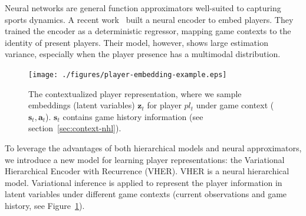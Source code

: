 \documentclass{article}
\newcommand{\latentvariables}{\mathbf{z}}
\newcommand{\state}{\mathbf{s}}
\newcommand{\action}{\mathbf{a}}
\newcommand{\player}{pl}
\begin{document}
Neural networks are general function approximators well-suited to capturing sports dynamics.
A recent work~\cite{ganguly2018problem} built a neural encoder to embed players.
They trained the encoder as a deterministic regressor, mapping game contexts to the identity of present players.
Their model, however,  shows large estimation variance, especially when the player presence has a multimodal distribution.

\begin{figure}[t!]
    \centering
    \texttt{[image: ./figures/player-embedding-example.eps]}
    \caption{The contextualized player representation, where we sample embeddings (latent variables) $\latentvariables_{t}$ for player $\player_{t}$ under game context ($\state_{t},\action_{t}$). $\state_{t}$ contains game history information (see section~\ref{sec:context-nhl}).
    } 
    \label{fig:player-represent}
\end{figure}



To leverage the advantages of both hierarchical models and neural approximators, we introduce a new model for learning player representations: the Variational Hierarchical Encoder with Recurrence (VHER). VHER is a neural hierarchical model.  Variational inference is applied to represent the player information in latent variables under different game contexts (current observations and game history, see Figure~\ref{fig:player-represent}).
\end{document}
